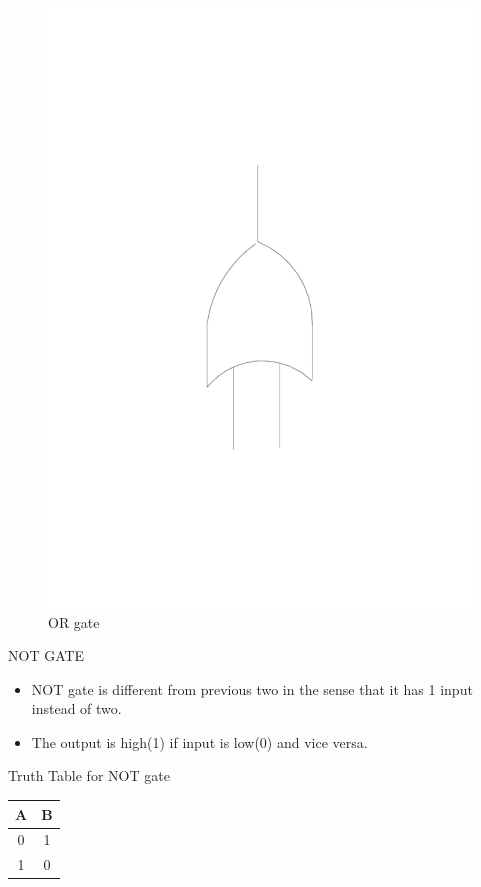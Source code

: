 \documentclass{beamer}
\begin{document}
\begin{frame}
\begin{figure}
\includegraphics[scale=0.2]{../beamer_bib/or.pdf} 
\caption{OR gate}
\end{figure}
\end{frame}
\begin{frame}[label=NOT]{NOT GATE}
\begin{block}{}
\begin{itemize}
  \item NOT gate is different from previous two in the sense that it has 1 input instead of two.
  \item The output is high(1) if input is low(0) and vice versa.
  
\end{itemize}
\end{block}
\medskip
\medskip
\pause
\begin{block}{Truth Table for NOT gate}
\begin{tabular}{|c|c|}
\hline
 \textbf{A} &
\textbf{B} \\
\hline
\hline
 0 & 1 \\
\hline
 1 & 0 \\
\hline
\end{tabular}
\end{block}
\end{frame}
\end{document}

